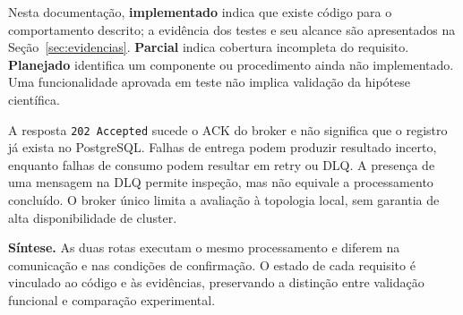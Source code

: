 Nesta documentação, \textbf{implementado} indica que existe código para o comportamento descrito; a evidência dos testes e seu alcance são apresentados na Seção~\ref{sec:evidencias}. \textbf{Parcial} indica cobertura incompleta do requisito. \textbf{Planejado} identifica um componente ou procedimento ainda não implementado. Uma funcionalidade aprovada em teste não implica validação da hipótese científica.

A resposta \texttt{202 Accepted} sucede o ACK do broker e não significa que o registro já exista no PostgreSQL. Falhas de entrega podem produzir resultado incerto, enquanto falhas de consumo podem resultar em retry ou DLQ. A presença de uma mensagem na DLQ permite inspeção, mas não equivale a processamento concluído. O broker único limita a avaliação à topologia local, sem garantia de alta disponibilidade de cluster.

\textbf{Síntese.} As duas rotas executam o mesmo processamento e diferem na comunicação e nas condições de confirmação. O estado de cada requisito é vinculado ao código e às evidências, preservando a distinção entre validação funcional e comparação experimental.
